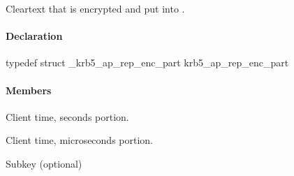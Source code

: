 \documentclass[letterpaper,10pt,english]{sphinxmanual}
\begin{document}
Cleartext that is encrypted and put into  .


\paragraph{Declaration}
\label{appdev/refs/types/krb5_ap_rep_enc_part:declaration}
typedef struct \_krb5\_ap\_rep\_enc\_part  krb5\_ap\_rep\_enc\_part


\paragraph{Members}
\label{appdev/refs/types/krb5_ap_rep_enc_part:members}

\begin{fulllineitems}
\label{appdev/refs/types/krb5_ap_rep_enc_part:krb5_ap_rep_enc_part.magic}
\end{fulllineitems}


\begin{fulllineitems}
\label{appdev/refs/types/krb5_ap_rep_enc_part:krb5_ap_rep_enc_part.ctime}
Client time, seconds portion.

\end{fulllineitems}


\begin{fulllineitems}
\label{appdev/refs/types/krb5_ap_rep_enc_part:krb5_ap_rep_enc_part.cusec}
Client time, microseconds portion.

\end{fulllineitems}


\begin{fulllineitems}
\label{appdev/refs/types/krb5_ap_rep_enc_part:krb5_ap_rep_enc_part.subkey}
Subkey (optional)

\end{fulllineitems}
\end{document}
